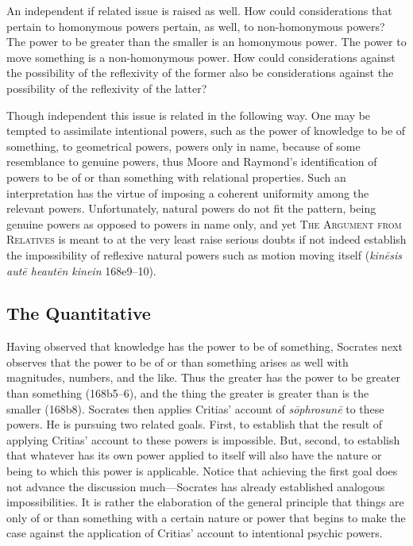 An independent if related issue is raised as well. How could considerations that pertain to homonymous powers pertain, as well, to non-homonymous powers? The power to be greater than the smaller is an homonymous power. The power to move something is a non-homonymous power. How could considerations against the possibility of the reflexivity of the former also be considerations against the possibility of the reflexivity of the latter?

Though independent this issue is related in the following way. One may be tempted to assimilate intentional powers, such as the power of knowledge to be of something, to geometrical powers, powers only in name, because of some resemblance to genuine powers, thus Moore and Raymond's \citeyearpar[24 n74]{Moore:2019aa} identification of powers to be of or than something with relational properties. Such an interpretation has the virtue of imposing a coherent uniformity among the relevant powers. Unfortunately, natural powers do not fit the pattern, being genuine powers as opposed to powers in name only, and yet \textsc{The Argument from Relatives} is meant to at the very least raise serious doubts if not indeed establish the impossibility of reflexive natural powers such as motion moving itself (\emph{kinēsis autē heautēn kinein} 168e9–10).

\subsection{The Quantitative} %
\label{sub:the_quantitative}

Having observed that knowledge has the power to be of something, Socrates next observes that the power to be of or than something arises as well with magnitudes, numbers, and the like. Thus the greater has the power to be greater than something (168b5–6), and the thing the greater is greater than is the smaller (168b8). Socrates then applies Critias' account of \emph{sōphrosunē} to these powers. He is pursuing two related goals. First, to establish that the result of applying Critias' account to these powers is impossible. But, second, to establish that whatever has its own power applied to itself will also have the nature or being to which this power is applicable. Notice that achieving the first goal does not advance the discussion much—Socrates has already established analogous impossibilities. It is rather the elaboration of the general principle that things are only of or than something with a certain nature or power that begins to make the case against the application of Critias' account to intentional psychic powers.

